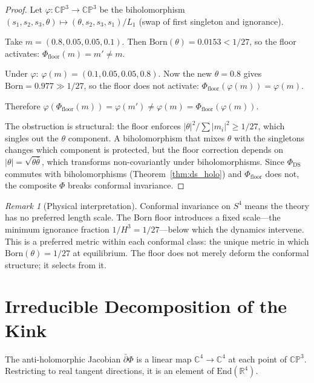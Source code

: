 \documentclass[11pt,a4paper]{article}
\theoremstyle{definition}
\theoremstyle{remark}
\newtheorem{remark}[theorem]{Remark}
\newcommand{\CP}{\mathbb{CP}}
\newcommand{\C}{\mathbb{C}}
\newcommand{\R}{\mathbb{R}}
\newcommand{\dbar}{\bar{\partial}}
\begin{document}
\begin{proof}
Let $\varphi:\CP^3\to\CP^3$ be the biholomorphism $(s_1,s_2,s_3,\theta)\mapsto(\theta,s_2,s_3,s_1)/L_1$ (swap of first singleton and ignorance).

Take $m=(0.8,0.05,0.05,0.1)$. Then $\mathrm{Born}(\theta)=0.0153<1/27$, so the floor activates: $\Phi_{\mathrm{floor}}(m)=m'\neq m$.

Under $\varphi$: $\varphi(m)=(0.1,0.05,0.05,0.8)$. Now the new $\theta=0.8$ gives $\mathrm{Born}=0.977\gg 1/27$, so the floor does not activate: $\Phi_{\mathrm{floor}}(\varphi(m))=\varphi(m)$.

Therefore $\varphi(\Phi_{\mathrm{floor}}(m))=\varphi(m')\neq\varphi(m)=\Phi_{\mathrm{floor}}(\varphi(m))$.

The obstruction is structural: the floor enforces $|\theta|^2/\sum|m_i|^2\geq 1/27$, which singles out the $\theta$ component. A biholomorphism that mixes $\theta$ with the singletons changes which component is protected, but the floor correction depends on $|\theta|=\sqrt{\theta\bar\theta}$, which transforms non-covariantly under biholomorphisms. Since $\Phi_{\mathrm{DS}}$ commutes with biholomorphisms (Theorem~\ref{thm:ds_holo}) and $\Phi_{\mathrm{floor}}$ does not, the composite $\Phi$ breaks conformal invariance.
\end{proof}

\begin{remark}[Physical interpretation]
Conformal invariance on $S^4$ means the theory has no preferred length scale. The Born floor introduces a fixed scale---the minimum ignorance fraction $1/H^3=1/27$---below which the dynamics intervene. This is a preferred metric within each conformal class: the unique metric in which $\mathrm{Born}(\theta)=1/27$ at equilibrium. The floor does not merely deform the conformal structure; it selects from it.
\end{remark}


\section{Irreducible Decomposition of the Kink}\label{sec:kink_decomp}

The anti-holomorphic Jacobian $\dbar\Phi$ is a linear map $\C^4\to\C^4$ at each point of $\CP^3$. Restricting to real tangent directions, it is an element of $\mathrm{End}(\R^4)$.
\end{document}
